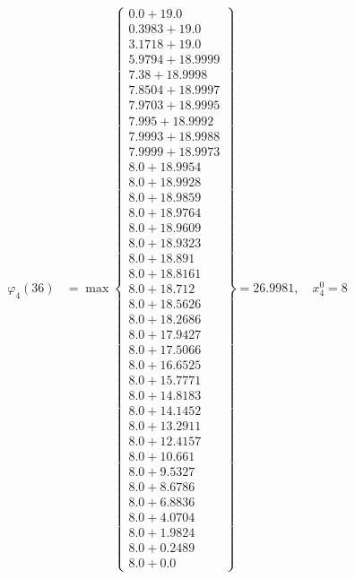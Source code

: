 \documentclass{article}
\begin{document}
\begin{align*}
  
\varphi_{4}(36) &= \max \left\{ \begin{array}{c}
0.0 + 19.0 \\
 0.3983 + 19.0 \\
 3.1718 + 19.0 \\
 5.9794 + 18.9999 \\
 7.38 + 18.9998 \\
 7.8504 + 18.9997 \\
 7.9703 + 18.9995 \\
 7.995 + 18.9992 \\
 7.9993 + 18.9988 \\
 7.9999 + 18.9973 \\
 8.0 + 18.9954 \\
 8.0 + 18.9928 \\
 8.0 + 18.9859 \\
 8.0 + 18.9764 \\
 8.0 + 18.9609 \\
 8.0 + 18.9323 \\
 8.0 + 18.891 \\
 8.0 + 18.8161 \\
 8.0 + 18.712 \\
 8.0 + 18.5626 \\
 8.0 + 18.2686 \\
 8.0 + 17.9427 \\
 8.0 + 17.5066 \\
 8.0 + 16.6525 \\
 8.0 + 15.7771 \\
 8.0 + 14.8183 \\
 8.0 + 14.1452 \\
 8.0 + 13.2911 \\
 8.0 + 12.4157 \\
 8.0 + 10.661 \\
 8.0 + 9.5327 \\
 8.0 + 8.6786 \\
 8.0 + 6.8836 \\
 8.0 + 4.0704 \\
 8.0 + 1.9824 \\
 8.0 + 0.2489 \\
 8.0 + 0.0
\end{array} \right\}=26.9981,\quad x_{4}^0=8\\
  
  
\end{align*}
\end{document}
